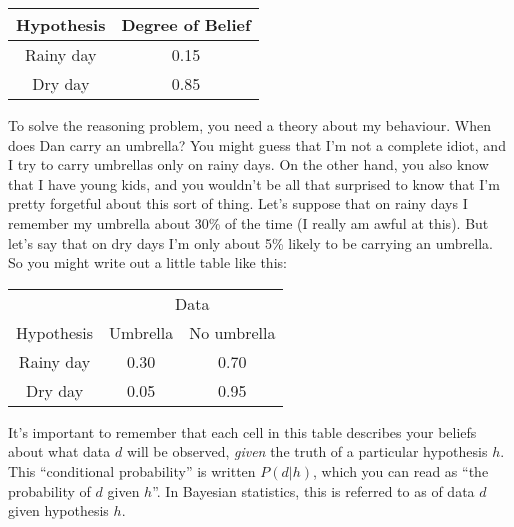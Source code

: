 \begin{center}
\begin{tabular}{c|c}
Hypothesis & Degree of Belief \\ \hline
Rainy day & 0.15 \\
Dry day & 0.85
\end{tabular}
\end{center}



To solve the reasoning problem, you need a theory about my behaviour. When does Dan carry an umbrella? You might guess that I'm not a complete idiot, and I try to carry umbrellas only on rainy days. On the other hand, you also know that I have young kids, and you wouldn't be all that surprised to know that I'm pretty forgetful about this sort of thing. Let's suppose that on rainy days I remember my umbrella about 30\% of the time (I really am awful at this). But let's say that on dry days I'm only about 5\% likely to be carrying an umbrella. So you might write out a little table like this:

\begin{center}
\begin{tabular}{c|cc}
 & \multicolumn{2}{|c}{Data} \\ 
Hypothesis & Umbrella & No umbrella \\ \hline
Rainy day & 0.30 & 0.70 \\
Dry day & 0.05 & 0.95 
\end{tabular}
\end{center}

\noindent
It's important to remember that each cell in this table describes your beliefs about what data $d$ will be observed, {\it given} the truth of a particular hypothesis $h$. This ``conditional probability'' is written $P(d|h)$, which you can read as ``the probability of $d$ given $h$''. In Bayesian statistics, this is referred to as  of data $d$ given hypothesis $h$.

